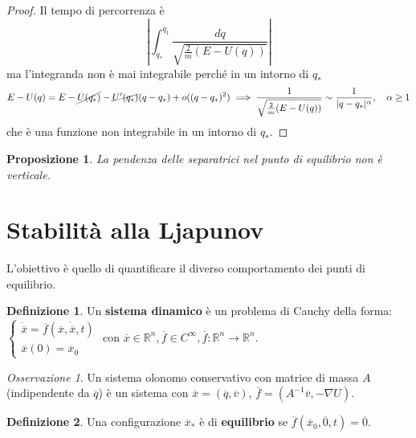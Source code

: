 \documentclass{book}
\theoremstyle{plain}
\theoremstyle{plain}
\theoremstyle{plain}
\theoremstyle{plain}
\theoremstyle{plain}
\newtheorem{prop}{Proposizione}[chapter]
\theoremstyle{definition}
\newtheorem{defi}{Definizione}[chapter]
\theoremstyle{remark}
\newtheorem*{oss}{Osservazione}
\theoremstyle{definition}
\begin{document}
\begin{proof}
    Il tempo di percorrenza è
    \begin{displaymath}
        \left|\int_{q_*}^{q_1}\frac{dq}{\sqrt{\frac{2}{m}(E-U(q))}}\right|
    \end{displaymath}
    ma l'integranda non è mai integrabile perché in un intorno di $q_*$
    \begin{displaymath}
        E-U(q)=E-\cancel{U(q_*)}-\cancel{U'(q_*)}(q-q_*)+o((q-q_*)^2) \implies\frac{1}{\sqrt{\frac{2}{m}(E-U(q))}}\sim\frac{1}{|q-q_*|^{\alpha}}, \quad \alpha \geq 1
    \end{displaymath}
    che è una funzione non integrabile in un intorno di $q_*$.
\end{proof}

\begin{prop}
    La pendenza delle separatrici nel punto di equilibrio non è verticale.
\end{prop}

\section{Stabilità alla Ljapunov}

L'obiettivo è quello di quantificare il diverso comportamento dei punti di equilibrio.

\begin{defi}
    Un \textbf{sistema dinamico} è un problema di Cauchy della forma:
    $\begin{cases}
        \dot{\overline{x}}=\overline{f}(\overline{x},\dot{\overline{x}},t) \\ \overline{x}(0)=\overline{x}_0    
    \end{cases}$
    con $\overline{x}\in\mathbb{R}^n, \overline{f} \in C^{\infty}, \overline{f}: \mathbb{R}^n \to \mathbb{R}^n$.
\end{defi}

\begin{oss}
    Un sistema olonomo conservativo con matrice di massa $A$ (indipendente da $\overline{q}$) è un sistema con $\overline{x}=(\overline{q},\overline{v})$, $\overline{f}=(A^{-1}\overline{v},-\nabla U)$.
\end{oss}

\begin{defi}
    Una configurazione $\overline{x}_*$ è di \textbf{equilibrio} se $\overline{f}(\overline{x}_0,\overline{0},t)=\overline{0}$.
\end{defi}
\end{document}
